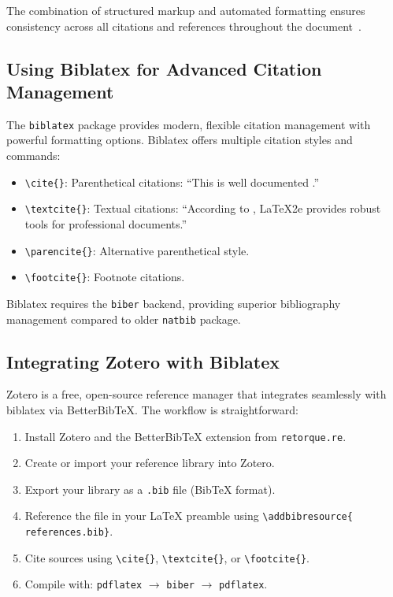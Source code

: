 \documentclass{tietreport}
\begin{document}
The combination of structured markup and automated
formatting ensures consistency across all citations and
references throughout the document~\cite{knuth1984}.

\subsection{Using Biblatex for Advanced Citation
  Management}

The \texttt{biblatex} package provides modern,
flexible citation management with powerful
formatting options. Biblatex offers multiple
citation styles and commands:

\begin{itemize}
\item \texttt{\textbackslash cite\{\}}:
  Parenthetical citations: ``This is well
  documented \cite{lamport94,knuth1984}.''
\item \texttt{\textbackslash textcite\{\}}:
  Textual citations: ``According to
  \textcite{latex2e}, LaTeX2e provides robust
  tools for professional documents.''
\item \texttt{\textbackslash parencite\{\}}:
  Alternative parenthetical style.
\item \texttt{\textbackslash footcite\{\}}:
  Footnote citations.
\end{itemize}

Biblatex requires the \texttt{biber} backend,
providing superior bibliography management
compared to older \texttt{natbib} package.

\subsection{Integrating Zotero with Biblatex}

Zotero is a free, open-source reference
manager that integrates seamlessly with
biblatex via BetterBibTeX. The workflow
is straightforward:

\begin{enumerate}
\item Install Zotero and the BetterBibTeX
  extension from \texttt{retorque.re}.
\item Create or import your reference
  library into Zotero.
\item Export your library as a
  \texttt{.bib} file (BibTeX format).
\item Reference the file in your LaTeX
  preamble using
  \texttt{\textbackslash addbibresource\{%
  references.bib\}}.
\item Cite sources using
  \texttt{\textbackslash cite\{\}},
  \texttt{\textbackslash textcite\{\}},
  or \texttt{\textbackslash footcite\{\}}.
\item Compile with: \texttt{pdflatex}
  $\rightarrow$ \texttt{biber}
  $\rightarrow$ \texttt{pdflatex}.
\end{enumerate}
\end{document}
